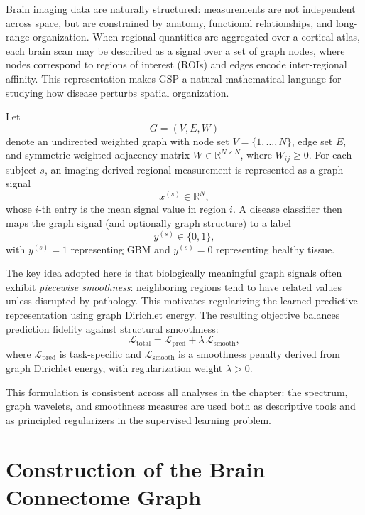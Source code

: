 Brain imaging data are naturally structured: measurements are not independent across space, but are constrained by anatomy, functional relationships, and long-range organization. When regional quantities are aggregated over a cortical atlas, each brain scan may be described as a signal over a set of graph nodes, where nodes correspond to regions of interest (ROIs) and edges encode inter-regional affinity. This representation makes GSP a natural mathematical language for studying how disease perturbs spatial organization.

Let
\[
G = (V,E,W)
\]
denote an undirected weighted graph with node set \(V=\{1,\dots,N\}\), edge set \(E\), and symmetric weighted adjacency matrix \(W \in \mathbb{R}^{N\times N}\), where \(W_{ij} \ge 0\). For each subject \(s\), an imaging-derived regional measurement is represented as a graph signal
\[
x^{(s)} \in \mathbb{R}^{N},
\]
whose \(i\)-th entry is the mean signal value in region \(i\). A disease classifier then maps the graph signal (and optionally graph structure) to a label
\[
y^{(s)} \in \{0,1\},
\]
with \(y^{(s)}=1\) representing GBM and \(y^{(s)}=0\) representing healthy tissue.

The key idea adopted here is that biologically meaningful graph signals often exhibit \emph{piecewise smoothness}: neighboring regions tend to have related values unless disrupted by pathology. This motivates regularizing the learned predictive representation using graph Dirichlet energy. The resulting objective balances prediction fidelity against structural smoothness:
\begin{equation}
\label{eq:main_objective_intro}
\mathcal{L}_{\text{total}}
=
\mathcal{L}_{\text{pred}}
+
\lambda \,\mathcal{L}_{\text{smooth}},
\end{equation}
where \(\mathcal{L}_{\text{pred}}\) is task-specific and \(\mathcal{L}_{\text{smooth}}\) is a smoothness penalty derived from graph Dirichlet energy, with regularization weight \(\lambda>0\).

This formulation is consistent across all analyses in the chapter: the spectrum, graph wavelets, and smoothness measures are used both as descriptive tools and as principled regularizers in the supervised learning problem.

\section{Construction of the Brain Connectome Graph}
\label{sec:ch4_graph_construction} %

